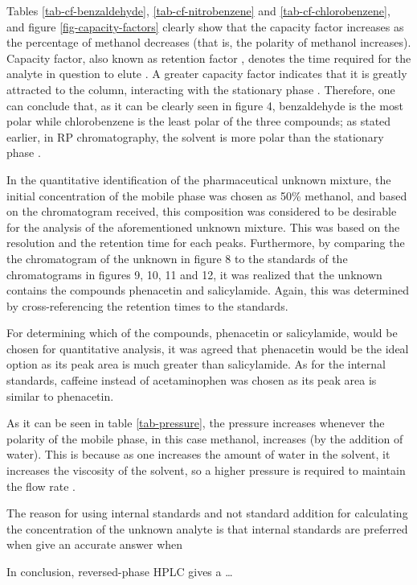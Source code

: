 \documentclass[a4paper, 12pt]{article}
\begin{document}
Tables \ref{tab-cf-benzaldehyde}, \ref{tab-cf-nitrobenzene} and \ref{tab-cf-chlorobenzene}, and figure \ref{fig-capacity-factors} clearly show that the capacity factor increases as the percentage of methanol decreases (that is, the polarity of methanol increases). Capacity factor, also known as retention factor \cite{harris}, denotes the time required for the analyte in question to elute \cite{harris}. A greater capacity factor indicates that it is greatly attracted to the column, interacting with the stationary phase \cite{harris}. Therefore, one can conclude that, as it can be clearly seen in figure 4, benzaldehyde is the most polar while chlorobenzene is the least polar of the three compounds; as stated earlier, in RP chromatography, the solvent is more polar than the stationary phase \cite{harris}.

In the quantitative identification of the pharmaceutical unknown mixture, the initial concentration of the mobile phase was chosen as 50\% methanol, and based on the chromatogram received, this composition was considered to be desirable for the analysis of the aforementioned unknown mixture. This was based on the resolution and the retention time for each peaks. Furthermore, by comparing the the chromatogram of the unknown in figure 8 to the standards of the chromatograms in figures 9, 10, 11 and 12, it was realized that the unknown contains the compounds phenacetin and salicylamide. Again, this was determined by cross-referencing the retention times to the standards.

For determining which of the compounds, phenacetin or salicylamide, would be chosen for quantitative analysis, it was agreed that phenacetin would be the ideal option as its peak area is much greater than salicylamide. As for the internal standards, caffeine instead of acetaminophen was chosen as its peak area is similar to phenacetin.

As it can be seen in table \ref{tab-pressure}, the pressure increases whenever the polarity of the mobile phase, in this case methanol, increases (by the addition of water). This is because as one increases the amount of water in the solvent, it increases the viscosity of the solvent, so a higher pressure is required to maintain the flow rate \cite{harris}.

The reason for using internal standards and not standard addition for calculating the concentration of the unknown analyte is that internal standards are preferred when give an accurate answer when 

In conclusion, reversed-phase HPLC gives a \dots
\end{document}
